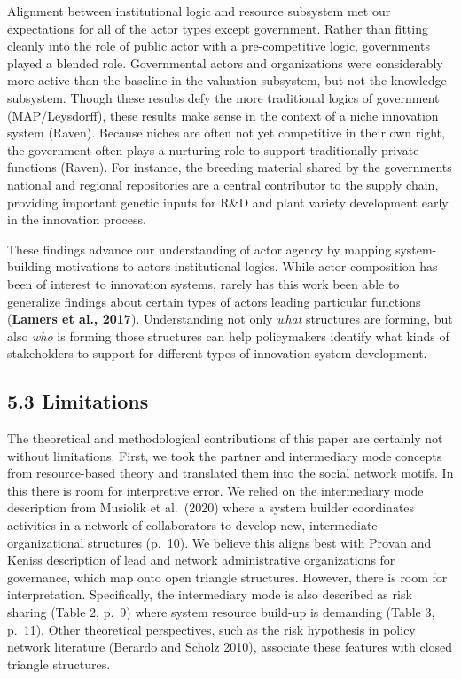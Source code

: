 \documentclass[twoside,12pt,final]{ucthesis-CA2012}
\begin{document}
\begin{ucmainmatter}
Alignment between institutional logic and resource subsystem met our
expectations for all of the actor types except government. Rather than
fitting cleanly into the role of public actor with a pre-competitive
logic, governments played a blended role. Governmental actors and
organizations were considerably more active than the baseline in the
valuation subsystem, but not the knowledge subsystem. Though these
results defy the more traditional logics of government (MAP/Leysdorff),
these results make sense in the context of a niche innovation system
(Raven). Because niches are often not yet competitive in their own
right, the government often plays a nurturing role to support
traditionally private functions (Raven). For instance, the breeding
material shared by the government\textquotesingle s national and regional repositories
are a central contributor to the supply chain, providing important
genetic inputs for R\&D and plant variety development early in the
innovation process.

These findings advance our understanding of actor agency by mapping
system-building motivations to actors\textquotesingle{} institutional logics. While
actor composition has been of interest to innovation systems, rarely has
this work been able to generalize findings about certain types of actors
leading particular functions (\textbf{Lamers et al., 2017}). Understanding
not only \emph{what} structures are forming, but also \emph{who} is forming those
structures can help policymakers identify what kinds of stakeholders to
support for different types of innovation system development.

\hypertarget{limitations-1}{%
\subsection{5.3 Limitations}\label{limitations-1}}

The theoretical and methodological contributions of this paper are
certainly not without limitations. First, we took the partner and
intermediary mode concepts from resource-based theory and translated
them into the social network motifs. In this there is room for
interpretive error. We relied on the intermediary mode description from
Musiolik et al.~(2020) where \textquotesingle a system builder coordinates activities
in a network of collaborators to develop new, intermediate
organizational structures\textquotesingle{} (p.~10). We believe this aligns best with
Provan and Kenis\textquotesingle s description of \textquotesingle lead\textquotesingle{} and \textquotesingle network
administrative\textquotesingle{} organizations for governance, which map onto open
triangle structures. However, there is room for interpretation.
Specifically, the intermediary mode is also described as \textquotesingle risk
sharing\textquotesingle{} (Table 2, p.~9) where \textquotesingle system resource build-up is
demanding\textquotesingle{} (Table 3, p.~11). Other theoretical perspectives, such as
the risk hypothesis in policy network literature (Berardo and Scholz
2010), associate these features with closed triangle structures.


\end{ucmainmatter}
\end{document}
